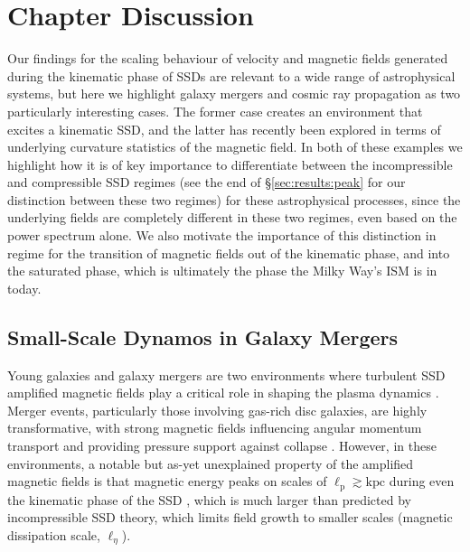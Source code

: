 \section{Chapter Discussion}
\label{sec:discussion}

Our findings for the scaling behaviour of velocity and magnetic fields generated during the kinematic phase of SSDs are relevant to a wide range of astrophysical systems, but here we highlight galaxy mergers and cosmic ray propagation as two particularly interesting cases. The former case creates an environment that excites a kinematic SSD, and the latter has recently been explored in terms of underlying curvature statistics of the magnetic field. In both of these examples we highlight how it is of key importance to differentiate between the incompressible and compressible SSD regimes (see the end of \S\ref{sec:results:peak} for our distinction between these two regimes) for these astrophysical processes, since the underlying fields are completely different in these two regimes, even based on the power spectrum alone. We also motivate the importance of this distinction in regime for the transition of magnetic fields out of the kinematic phase, and into the saturated phase, which is ultimately the phase the Milky Way's ISM is in today.

\subsection{Small-Scale Dynamos in Galaxy Mergers}

Young galaxies \citep{geach2023polarized} and galaxy mergers are two environments where turbulent SSD amplified magnetic fields play a critical role in shaping the plasma dynamics \citep[\eg][]{pakmor2014magnetic, pakmor2017magnetic, martin2018three, martin2022towards, brzycki2019parameter, whittingham2021impact, whittingham2023impact, pfrommer2022simulating}. Merger events, particularly those involving gas-rich disc galaxies, are highly transformative, with strong magnetic fields influencing angular momentum transport and providing pressure support against collapse \citep{whittingham2021impact}. However, in these environments, a notable but as-yet unexplained property of the amplified magnetic fields is that magnetic energy peaks on scales of $\ell_\mathrm{p} \gtrsim \mathrm{kpc}$ during even the kinematic phase of the SSD \citep[\eg][]{rodenbeck2016magnetic, basu2017detection, brzycki2019parameter, whittingham2021impact, pfrommer2022simulating}, which is much larger than predicted by incompressible SSD theory, which limits field growth to smaller scales (\ie magnetic dissipation scale, $\ell_\eta$).

